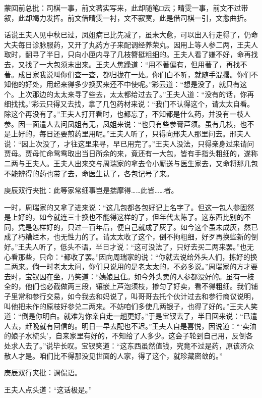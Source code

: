 \begin{parag}
    \begin{note}蒙回前总批：司棋一事，前文著实写来，此却随笔□去；晴雯一事，前文不过带叙，此却竭力发挥。前文借晴雯一衬，文不寂寞，此是借司棋一引，文愈曲折。\end{note}
\end{parag}


\begin{parag}
    话说王夫人见中秋已过，凤姐病已比先减了，虽未大愈，可以出入行走得了，仍命大夫每日诊脉服药，又开了丸药方子来配调经养荣丸。因用上等人参二两，王夫人取时，翻寻了半日，只向小匣内寻了几枝簪挺粗细的。王夫人看了嫌不好，命再找去，又找了一大包须末出来。王夫人焦躁道：“用不著偏有，但用著了，再找不著。成日家我说叫你们查一查，都归拢在一处。你们白不听，就随手混撂。你们不知他的好处，用起来得多少换买来还不中使呢。”彩云道：“想是没了，就只有这个。上次那边的太太来寻了些去，太太都给过去了。”王夫人道：“没有的话，你再细找找。”彩云只得又去找，拿了几包药材来说：“我们不认得这个，请太太自看。除这个再没有了。”王夫人打开看时，也都忘了，不知都是什么药，并没有一枝人参。因一面遣人去问凤姐有无，凤姐来说：“也只有些参膏芦须。虽有几枝，也不是上好的，每日还要煎药里用呢。”王夫人听了，只得向邢夫人那里问去。邢夫人说：“因上次没了，才往这里来寻，早已用完了。”王夫人没法，只得亲身过来请问贾母。贾母忙命鸳鸯取出当日所余的来，竟还有一大包，皆有手指头粗细的，遂称二两与王夫人。王夫人出来交与周瑞家的拿去令小厮送与医生家去，又命将那几包不能辨得的药也带了去，命医生认了，各包记号了来。\begin{note}庚辰双行夹批：此等家常细事岂是揣摩得……此皆……者。\end{note}
\end{parag}


\begin{parag}
    一时，周瑞家的又拿了进来说：“这几包都各包好记上名字了。但这一包人参固然是上好的，如今就连三十换也不能得这样的了，但年代太陈了。这东西比别的不同，凭是怎样好的，只过一百年后，便自己就成了灰了。如今这个虽未成灰，然已成了朽糟烂木，也无性力的了。请太太收了这个，倒不拘粗细，好歹再换些新的倒好。”王夫人听了，低头不语，半日才说：“这可没法了，只好去买二两来罢。”也无心看那些，只命：“都收了罢。”因向周瑞家的说：“你就去说给外头人们，拣好的换二两来。倘一时老太太问，你们只说用的是老太太的，不必多说。”周瑞家的方才要去时，宝钗因在坐，乃笑道：“姨娘且住。如今外头卖的人参都没好的。虽有一枝全的，他们也必截做两三段，镶嵌上芦泡须枝，掺匀了好卖，看不得粗细。我们铺子里常和参行交易，如今我去和妈说了，叫哥哥去托个伙计过去和参行商议说明，叫他把未作的原枝好参兑二两来。不妨咱们多使几两银子，也得了好的。”王夫人笑道：“倒是你明白。就难为你亲自走一趟更好。”于是宝钗去了，半日回来说：“已遣人去，赶晚就有回信的。明日一早去配也不迟。”王夫人自是喜悦，因说道：“‘卖油的娘子水梳头’，自来家里有好的，不知给了人多少。这会子轮到自己用，反倒各处求人去了。”说毕长叹。宝钗笑道：“这东西虽然值钱，究竟不过是药，原该济众散人才是。咱们比不得那没见世面的人家，得了这个，就珍藏密敛的。”\begin{note}庚辰双行夹批：调侃语。\end{note}王夫人点头道：“这话极是。”
\end{parag}


